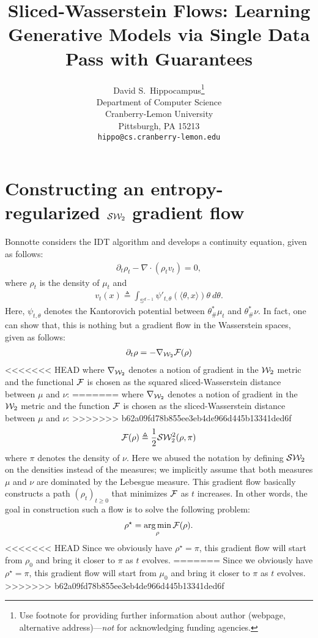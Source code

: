 \documentclass{article}
\title{Sliced-Wasserstein Flows: Learning Generative Models via Single Data Pass with Guarantees}
\author{
  David S.~Hippocampus\thanks{Use footnote for providing further
    information about author (webpage, alternative
    address)---\emph{not} for acknowledging funding agencies.} \\
  Department of Computer Science\\
  Cranberry-Lemon University\\
  Pittsburgh, PA 15213 \\
  \texttt{hippo@cs.cranberry-lemon.edu} \\
}
\newcommand{\W}{{\cal W}_2}
\newcommand{\F}{{\cal F}}
\newcommand{\SW}{{\cal S}{\cal W}_2}
\DeclareMathOperator*{\argmin}{arg\min}
\begin{document}

\maketitle

\begin{abstract}

\end{abstract}

\section{Constructing an entropy-regularized $\SW$ gradient flow}

Bonnotte \cite{bonnotte2013unidimensional} considers the IDT algorithm \cite{pitie2005n} and develops a continuity equation, given as follows:
\begin{align}
\partial_t \rho_t - \nabla \cdot (\rho_t v_t) = 0,
\end{align}
where $\rho_t$ is the density of $\mu_t$ and
\begin{align}
v_t(x) \triangleq \int_{\mathbb{S}^{d-1}} \psi'_{t,\theta}(\langle \theta, x \rangle) \theta \> d\theta. \label{eqn:idt_v}
\end{align}
Here, $\psi_{t,\theta}$ denotes the Kantorovich potential between $\theta^*_{\#}\mu_t$ and $\theta^*_{\#}\nu$. In fact, one can show that, this is nothing but a gradient flow in the Wasserstein spaces, given as follows:
\begin{align}
\partial_t \rho = - \nabla_{\W} \F(\rho) \label{eqn:gradflow}
\end{align}
<<<<<<< HEAD
where $\nabla_{\W}$ denotes a notion of gradient in the $\W$ metric and the functional $\F$ is chosen as the squared sliced-Wasserstein distance between $\mu$ and $\nu$:
=======
where $\nabla_{\W}$ denotes a notion of gradient in the $\W$ metric and the function $\F$ is chosen as the sliced-Wasserstein distance between $\mu$ and $\nu$:
>>>>>>> b62a09fd78b855ee3eb4de966d445b13341ded6f
\begin{align}
\F(\rho) \triangleq \frac1{2} \SW^2(\rho, \pi)
\end{align}
where $\pi$ denotes the density of $\nu$. Here we abused the notation by defining $\SW$ on the densities instead of the measures; we implicitly assume that both measures $\mu$ and $\nu$ are dominated by the Lebesgue measure. This gradient flow basically constructs a path $(\rho_t)_{t\geq 0}$ that minimizes $\F$ as $t$ increases. In other words, the goal in construction such a flow is to solve the following problem:
\begin{align}
\rho^\star = \argmin_\rho \F(\rho).
\end{align}
<<<<<<< HEAD
Since we obviously have $\rho^\star = \pi$, this gradient flow will start from $\rho_0$ and bring it closer to $\pi$ as $t$ evolves.
=======
Since we obviously have $\rho^\star = \pi$, this gradient flow will start from $\mu_0$ and bring it closer to $\pi$ as $t$ evolves.
>>>>>>> b62a09fd78b855ee3eb4de966d445b13341ded6f
\end{document}
